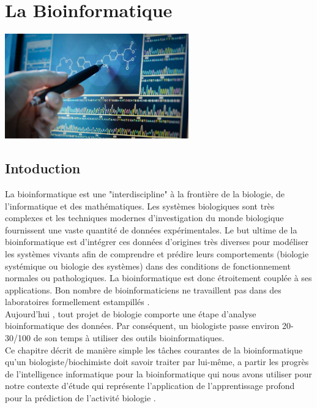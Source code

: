 \documentclass[12pt]{report}
\begin{document}
\chapter{La Bioinformatique}

\begin{center}
\includegraphics[width=300]{bio.jpg} 
\end{center}






\newpage
\section{Intoduction}
La bioinformatique est une "interdiscipline" à la frontière de la biologie, de l'informatique et des mathématiques. Les systèmes biologiques sont très complexes et les techniques modernes d'investigation du monde biologique fournissent une vaste quantité de données expérimentales. Le but ultime de la bioinformatique est d'intégrer ces données d'origines très diverses pour modéliser les systèmes vivants afin de comprendre
et prédire leurs comportements (biologie systémique ou biologie des systèmes) dans des conditions de fonctionnement normales ou pathologiques. La bioinformatique est donc étroitement couplée à ses applications. Bon nombre de bioinformaticiens ne travaillent pas dans des laboratoires formellement estampillés \cite{ref18} . 
\\
Aujourd'hui , tout projet de biologie comporte une étape d'analyse bioinformatique des données. Par conséquent, un biologiste passe environ 20-30/100 de son temps à utiliser des outils bioinformatiques.\\
Ce chapitre décrit de manière simple les tâches courantes de la bioinformatique qu'un biologiste/biochimiste doit savoir traiter par lui-même, a partir les progrès de l'intelligence informatique pour la bioinformatique qui nous avons utiliser pour notre contexte d'étude qui représente l'application de l'apprentissage profond pour la prédiction de l'activité biologie \cite{ref18} .
\newpage
\end{document}
